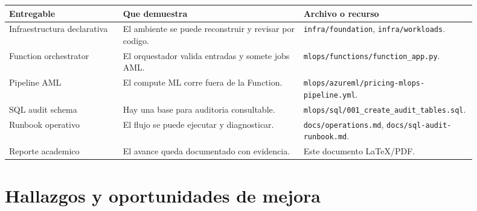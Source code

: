 \documentclass[11pt,letterpaper]{article}
\newcommand{\code}[1]{\texttt{\small #1}}
\begin{document}
\begin{longtable}{p{0.24\linewidth}p{0.38\linewidth}p{0.28\linewidth}}
\toprule
\textbf{Entregable} & \textbf{Que demuestra} & \textbf{Archivo o recurso}\\
\midrule
\endhead
Infraestructura declarativa & El ambiente se puede reconstruir y revisar por codigo. & \code{infra/foundation}, \code{infra/workloads}.\\
Function orchestrator & El orquestador valida entradas y somete jobs AML. & \code{mlops/functions/function\_app.py}.\\
Pipeline AML & El compute ML corre fuera de la Function. & \code{mlops/azureml/pricing-mlops-pipeline.yml}.\\
SQL audit schema & Hay una base para auditoria consultable. & \code{mlops/sql/001\_create\_audit\_tables.sql}.\\
Runbook operativo & El flujo se puede ejecutar y diagnosticar. & \code{docs/operations.md}, \code{docs/sql-audit-runbook.md}.\\
Reporte academico & El avance queda documentado con evidencia. & Este documento LaTeX/PDF.\\
\bottomrule
\end{longtable}

\section*{Hallazgos y oportunidades de mejora}
\end{document}
